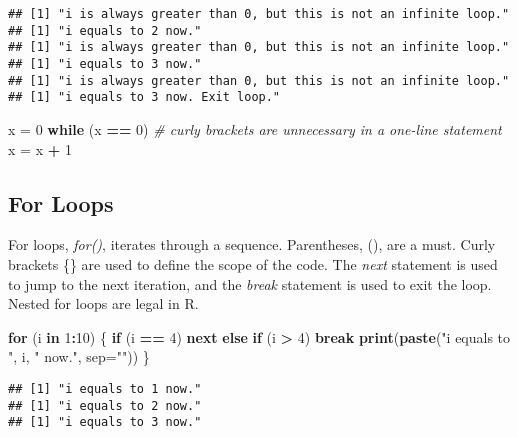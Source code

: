 \documentclass[
  12pt,
]{article}
\newenvironment{Shaded}{\begin{snugshade}}{\end{snugshade}}
\newcommand{\AttributeTok}[1]{\textcolor[rgb]{0.13,0.29,0.53}{#1}}
\newcommand{\CommentTok}[1]{\textcolor[rgb]{0.56,0.35,0.01}{\textit{#1}}}
\newcommand{\ControlFlowTok}[1]{\textcolor[rgb]{0.13,0.29,0.53}{\textbf{#1}}}
\newcommand{\DecValTok}[1]{\textcolor[rgb]{0.00,0.00,0.81}{#1}}
\newcommand{\FunctionTok}[1]{\textcolor[rgb]{0.13,0.29,0.53}{\textbf{#1}}}
\newcommand{\NormalTok}[1]{#1}
\newcommand{\OtherTok}[1]{\textcolor[rgb]{0.56,0.35,0.01}{#1}}
\newcommand{\SpecialCharTok}[1]{\textcolor[rgb]{0.81,0.36,0.00}{\textbf{#1}}}
\newcommand{\StringTok}[1]{\textcolor[rgb]{0.31,0.60,0.02}{#1}}
\begin{document}
\begin{verbatim}
## [1] "i is always greater than 0, but this is not an infinite loop."
## [1] "i equals to 2 now."
## [1] "i is always greater than 0, but this is not an infinite loop."
## [1] "i equals to 3 now."
## [1] "i is always greater than 0, but this is not an infinite loop."
## [1] "i equals to 3 now. Exit loop."
\end{verbatim}

\begin{Shaded}
\begin{Highlighting}[]
\NormalTok{x }\OtherTok{=} \DecValTok{0}
\ControlFlowTok{while}\NormalTok{ (x }\SpecialCharTok{==} \DecValTok{0}\NormalTok{)  }\CommentTok{\# curly brackets are unnecessary in a one{-}line statement}
\NormalTok{  x }\OtherTok{=}\NormalTok{ x }\SpecialCharTok{+} \DecValTok{1}
\end{Highlighting}
\end{Shaded}

\subsection{For Loops}
\label{sec:BRS-for}

For loops, \textit{for()}, iterates through a sequence. Parentheses, (),
are a must. Curly brackets \{\} are used to define the scope of the
code. The \textit{next} statement is used to jump to the next iteration,
and the \textit{break} statement is used to exit the loop. Nested for
loops are legal in R.

\begin{Shaded}
\begin{Highlighting}[]
\ControlFlowTok{for}\NormalTok{ (i }\ControlFlowTok{in} \DecValTok{1}\SpecialCharTok{:}\DecValTok{10}\NormalTok{) \{}
  \ControlFlowTok{if}\NormalTok{ (i }\SpecialCharTok{==} \DecValTok{4}\NormalTok{)}
    \ControlFlowTok{next} 
  \ControlFlowTok{else} \ControlFlowTok{if}\NormalTok{ (i }\SpecialCharTok{\textgreater{}} \DecValTok{4}\NormalTok{)}
    \ControlFlowTok{break}
  \FunctionTok{print}\NormalTok{(}\FunctionTok{paste}\NormalTok{(}\StringTok{"i equals to "}\NormalTok{, i, }\StringTok{" now."}\NormalTok{, }\AttributeTok{sep=}\StringTok{""}\NormalTok{))}
\NormalTok{\}}
\end{Highlighting}
\end{Shaded}

\begin{verbatim}
## [1] "i equals to 1 now."
## [1] "i equals to 2 now."
## [1] "i equals to 3 now."
\end{verbatim}
\end{document}
